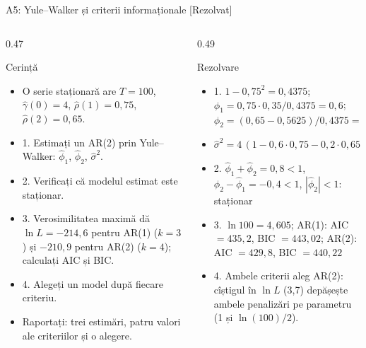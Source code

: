 \begin{frame}{A5: Yule--Walker și criterii informaționale [Rezolvat]}
\itemsize{\scriptsize}
\begin{columns}[T]
\begin{column}{0.47\textwidth}
\begin{block}{Cerință}
\begin{itemize}
    \item O serie staționară are $T = 100$, $\hat\gamma(0) = 4$, $\hat\rho(1) = 0{,}75$, $\hat\rho(2) = 0{,}65$.
    \item 1. Estimați un AR(2) prin Yule--Walker: $\hat\phi_1$, $\hat\phi_2$, $\hat\sigma^2$.
    \item 2. Verificați că modelul estimat este staționar.
    \item 3. Verosimilitatea maximă dă $\ln L = -214{,}6$ pentru AR(1) ($k = 3$) și $-210{,}9$ pentru AR(2) ($k = 4$); calculați AIC și BIC.
    \item 4. Alegeți un model după fiecare criteriu.
    \item Raportați: trei estimări, patru valori ale criteriilor și o alegere.
\end{itemize}
\end{block}
\end{column}
\begin{column}{0.49\textwidth}
\begin{exampleblock}{Rezolvare}
\begin{itemize}
    \item 1. $1 - 0{,}75^2 = 0{,}4375$; $\hat\phi_1 = 0{,}75 \cdot 0{,}35/0{,}4375 = 0{,}6$; $\hat\phi_2 = (0{,}65 - 0{,}5625)/0{,}4375 = 0{,}2$
    \item $\hat\sigma^2 = 4\,(1 - 0{,}6 \cdot 0{,}75 - 0{,}2 \cdot 0{,}65) = 1{,}68$
    \item 2. $\hat\phi_1 + \hat\phi_2 = 0{,}8 < 1$, $\hat\phi_2 - \hat\phi_1 = -0{,}4 < 1$, $|\hat\phi_2| < 1$: staționar
    \item 3. $\ln 100 = 4{,}605$; AR(1): AIC $= 435{,}2$, BIC $= 443{,}02$; AR(2): AIC $= 429{,}8$, BIC $= 440{,}22$
    \item 4. Ambele criterii aleg AR(2): cîștigul în $\ln L$ (3,7) depășește ambele penalizări pe parametru (1 și $\ln(100)/2$).
\end{itemize}
\end{exampleblock}
\end{column}
\end{columns}
\end{frame}

